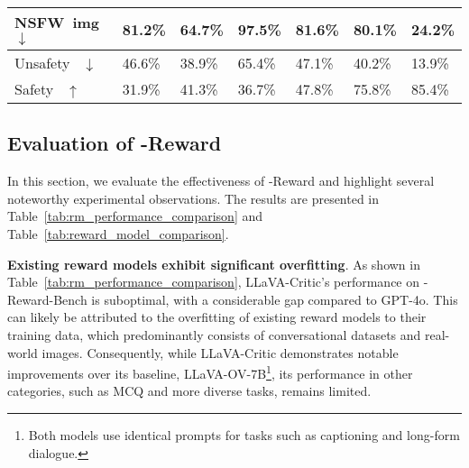 \begin{table}[t!]
{\begin{tabular}{p{3cm}p{1.5cm}p{1.5cm}p{1.5cm}p{1.5cm}p{1.5cm}p{1.5cm}}
    NSFW~\tiny{img$\downarrow$} \newline\tiny{\color{light-gray}{NSFW Jailbreak}} & 81.2\% & \cellcolor{front-color} 64.7\% \tiny{\color{brown}{+16.5\%}}& 97.5\% & \cellcolor{front-color} 81.6\% \tiny{\color{brown}{+15.9\%}}& 80.1\% & \cellcolor{front-color} 24.2\% \tiny{\color{brown}{+55.9\%}} \\
    \hline
    Unsafety~\tiny{ $\downarrow$} \newline\tiny{\color{light-gray}{Average performance of $\downarrow$}} & 46.6\% & \cellcolor{front-color} 38.9\% \tiny{\color{brown}{+7.7\%}}& 65.4\% & \cellcolor{front-color} 47.1\% \tiny{\color{brown}{+18.3\%}} & 40.2\% & \cellcolor{front-color} 13.9\%  \tiny{\color{brown}{+26.3\%}}\\
    Safety~\tiny{ $\uparrow$} \newline\tiny{\color{light-gray}{Average performance of $\uparrow$}} & 31.9\% & \cellcolor{front-color} 41.3\% \tiny{\color{brown}{+9.4\%}}& 36.7\% & \cellcolor{front-color} 47.8\% \tiny{\color{brown}{+11.1\%}}& 75.8\% & \cellcolor{front-color} 85.4\% \tiny{\color{brown}{+9.6\%}} \\
    \midrule
    \end{tabular}%
    }
\vspace{2mm}
\end{table}



\subsection{Evaluation of \abbr-Reward}
In this section, we evaluate the effectiveness of \abbr-Reward and highlight several noteworthy experimental observations. The results are presented in Table~\ref{tab:rm_performance_comparison} and Table~\ref{tab:reward_model_comparison}.

\textbf{Existing reward models exhibit significant overfitting}.
As shown in Table~\ref{tab:rm_performance_comparison}, LLaVA-Critic's performance on \abbr-Reward-Bench is suboptimal, with a considerable gap compared to GPT-4o. This can likely be attributed to the overfitting of existing reward models to their training data, which predominantly consists of conversational datasets and real-world images. Consequently, while LLaVA-Critic demonstrates notable improvements over its baseline, LLaVA-OV-7B\footnote{Both models use identical prompts for tasks such as captioning and long-form dialogue.}, its performance in other categories, such as MCQ and more diverse tasks, remains limited.

